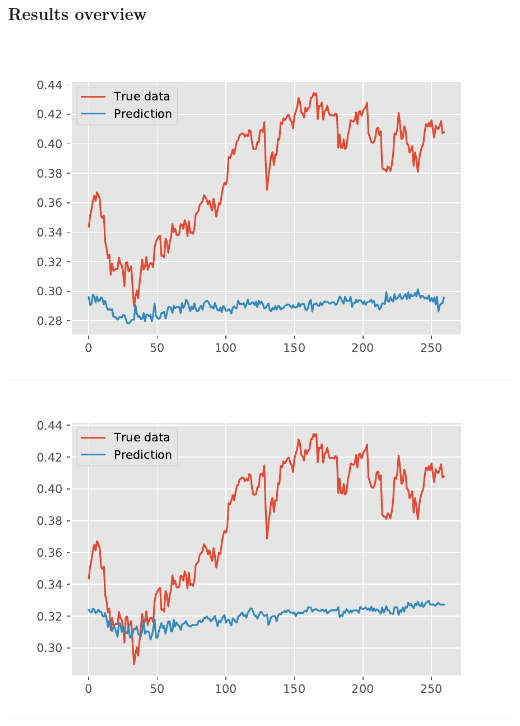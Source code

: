 \documentclass[12pt, a4paper]{article}
\begin{document}
\bgroup
  \inputminted[linenos, breaklines=true, fontsize=\scriptsize, firstnumber=last]{python}{src/stocks/lstm/4b_plot.py}
  \label{listing:slstm_4b_plot}
\egroup

\bgroup
  \inputminted[linenos, breaklines=true, fontsize=\scriptsize, firstnumber=last]{python}{src/stocks/lstm/4a_fit.py}
  \label{listing:slstm_4a_fit}
\egroup

\subsubsection{Results overview}

\begin{multicols}{2}
{\centering
\includegraphics[width=\columnwidth]{src/stocks/lstm/one_layer_pred}\\
\label{fig:lstm_pred_one}}
{\centering
\includegraphics[width=\columnwidth]{src/stocks/lstm/two_layer_pred}\\
\label{fig:lstm_pred_two}}
\end{multicols}
\end{document}

